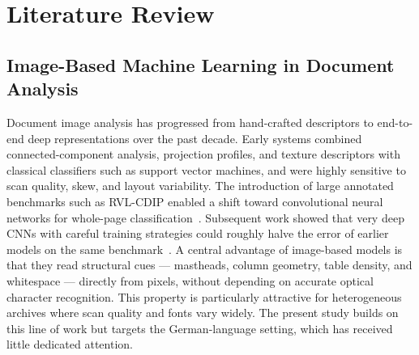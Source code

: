 \documentclass[preprint,12pt]{elsarticle}
\begin{document}
\section{Literature Review}\label{sec:lit}

\subsection{Image-Based Machine Learning in Document Analysis}
Document image analysis has progressed from hand-crafted descriptors to
end-to-end deep representations over the past decade.
Early systems combined connected-component analysis, projection profiles, and
texture descriptors with classical classifiers such as support vector machines,
and were highly sensitive to scan quality, skew, and layout variability.
The introduction of large annotated benchmarks such as RVL-CDIP enabled a shift
toward convolutional neural networks for whole-page
classification~\cite{harley2015evaluation}.
Subsequent work showed that very deep CNNs with careful training strategies could
roughly halve the error of earlier models on the same
benchmark~\cite{afzal2017cutting}.
A central advantage of image-based models is that they read structural cues ---
mastheads, column geometry, table density, and whitespace --- directly from
pixels, without depending on accurate optical character recognition.
This property is particularly attractive for heterogeneous archives where scan
quality and fonts vary widely.
The present study builds on this line of work but targets the German-language
setting, which has received little dedicated attention.
\end{document}
